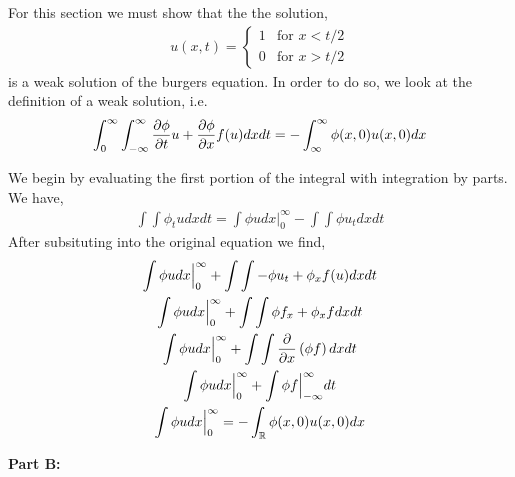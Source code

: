 \documentclass{article}
\begin{document}
For this section we must show that the the solution, 
\begin{gather*}
    u(x,t) = \begin{cases}
        1 & \text{for } x < t/2\\
        0 & \text{for } x > t/2\end{cases}
\end{gather*}
is a weak solution of the burgers equation. In order to do so, we look at the
definition of a weak solution, i.e. 
\begin{gather*}
    \int_0^{\infty}\int_{-\infty}^{\infty} \frac{\partial \phi}{\partial t}u +
    \frac{\partial \phi}{\partial x}f(u) dxdt = -\int_{\infty}^{\infty} \phi(x,0)u(x,0)dx
\end{gather*}

We begin by evaluating the first portion of the integral with integration
by parts. We have, 
\begin{gather*}
    \int\int \phi_t u  dxdt = \int \phi u dx \Big|_0^{\infty} - \int\int \phi
    u_t dxdt
\end{gather*}
After subsituting into the original equation we find, 
\begin{gather*}
    \int \phi u dx \Big|_0^{\infty} +  \int\int - \phi
    u_t + \phi_x f(u)  dxdt \\
    \int \phi u dx \Big|_0^{\infty} +  \int\int \phi
    f_x + \phi_x f  dxdt \\
    \int \phi u dx \Big|_0^{\infty} +  \int\int \frac{\partial }{\partial x}\left(\phi f\right) dxdt \\
    \int \phi u dx \Big|_0^{\infty} +  \int \phi f\Big|_{-\infty}^{\infty} dt \\
    \int \phi u dx \Big|_0^{\infty} = -\int_{\mathbb{R}} \phi(x,0)u(x,0)dx
\end{gather*}

\textbf{Part B:}
\end{document}
